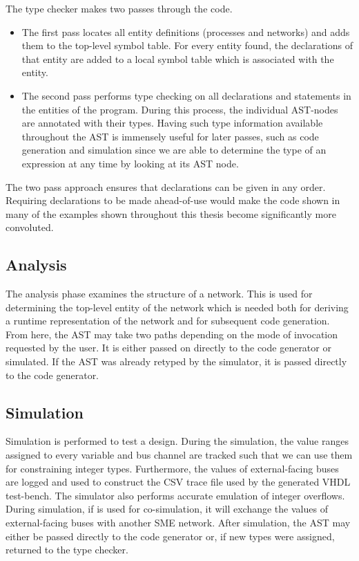 The type checker makes two passes through the code.
\begin{itemize}
\item The first pass locates all entity definitions (processes and networks) and
  adds them to the top-level symbol table. For every entity found, the
  declarations of that entity are added to a local symbol table which is
  associated with the entity.
\item The second pass performs type checking on all declarations and statements
  in the entities of the program. During this process, the individual AST-nodes
  are annotated with their types.  Having
  such type information available throughout the AST is immensely useful for
  later passes, such as code generation and simulation since we are able to
  determine the type of an expression at any time by looking at its AST node.

\end{itemize}

The two pass approach ensures that declarations can be given in any
order. Requiring declarations to be made ahead-of-use would make the code shown
in many of the examples shown throughout this thesis become significantly more
convoluted.
  
\subsection{Analysis} The analysis phase examines the structure of a network.
This is used for determining the top-level entity of the network which is needed
both for deriving a runtime representation of the network and for subsequent
code generation. From here, the AST may take two paths depending on the mode of
invocation requested by the user. It is either passed on directly to the code
generator or simulated. If the AST was already retyped by the simulator, it is
passed directly to the code generator.

\subsection{Simulation}
Simulation is performed to test a design. During the simulation, the value
ranges assigned to every variable and bus channel are tracked such that we can
use them for constraining integer types. Furthermore, the values of
external-facing buses are logged and used to construct the CSV trace file used
by the generated VHDL test-bench.  The simulator also performs accurate emulation of integer
overflows. During simulation, if \libsme{} is used for co-simulation, it will
exchange the values of external-facing buses with another SME network. After
simulation, the AST may either be passed directly to the code generator or, if
new types were assigned, returned to the type checker.

